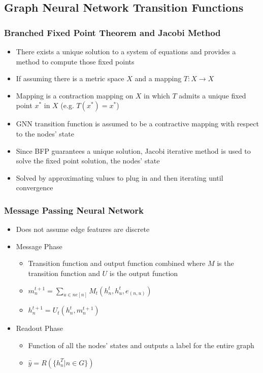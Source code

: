 \subsection{Graph Neural Network Transition Functions}
\subsubsection{Branched Fixed Point Theorem and Jacobi Method}
\begin{itemize}
	\item There exists a unique solution to a system of equations and provides a method to compute those fixed points
	\item If assuming there is a metric space $X$ and a mapping $T: X \rightarrow X$
	\item Mapping is a contraction mapping on $X$ in which $T$ admits a unique fixed point $x^{*}$ in $X$ (e.g. $T(x^{*}) = x^{*}$)
	\item GNN transition function is assumed to be a contractive mapping with respect to the nodes' state
	\item Since BFP guarantees a unique solution, Jacobi iterative method is used to solve the fixed point solution, the nodes' state
	\item Solved by approximating values to plug in and then iterating until convergence
\end{itemize}
\subsubsection{Message Passing Neural Network}
\begin{itemize}
	\item Does not assume edge features are discrete
	\item Message Phase
\begin{itemize}
	\item Transition function and output function combined where $M$ is the transition function and $U$ is the output function
	\item $m_{n}^{t+1} = \sum_{u \in ne[n]}M_{t}(h_{n}^{t}, h_{u}^{t}, e_{(n,u)})$
	\item $h_{n}^{t+1}=U_{t}(h_{n}^{t}, m_{n}^{t+1})$
\end{itemize}
	\item Readout Phase
\begin{itemize}
	\item Function of all the nodes' states and outputs a label for the entire graph
	\item $\hat{y} = R(\{h_{n}^{T} | n \in G\})$
\end{itemize}
\end{itemize}
